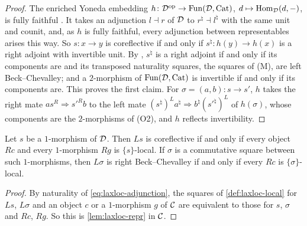 \begin{proof}
%
The enriched Yoneda embedding
$h\colon \mathcal{D}^{\mathrm{op}} \to \operatorname{Fun}(\mathcal{D},\mathrm{Cat})$,
$d \mapsto \operatorname{Hom}_{\mathcal{D}}(d,-)$,
is fully faithful \cite{hinich2020yoneda,heine2023enriched}. It takes an
adjunction $l \dashv r$ of $\mathcal{D}$ to
$r^{\natural} \dashv l^{\natural}$
with the same unit and counit, and, as $h$ is fully faithful, every adjunction
between representables arises this way. So $s\colon x \to y$ is coreflective if
and
only if
$s^{\natural}\colon h(y) \to h(x)$
is a right adjoint with invertible unit. By
\cite[Cor.~5.2.12]{abellangagnahaugseng2024straightening}, $s^{\natural}$ is a
right adjoint if and only if its components are and its transposed naturality
squares, the squares of (M), are left Beck--Chevalley; and a $2$-morphism of
$\operatorname{Fun}(\mathcal{D},\mathrm{Cat})$ is invertible if and only if its components are. This proves
the first claim. For
$\sigma = (a,b)\colon s \to s'$,
$h$ takes the right mate
$as^{R} \Rightarrow s'^{R}b$
to the left mate
$(s^{\natural})^{L}a^{\natural} \Rightarrow b^{\natural}(s'^{\natural})^{L}$
of $h(\sigma)$, whose components are the $2$-morphisms of (O2), and $h$
reflects invertibility.
\end{proof}

\begin{prop}
\label{prop:laxloc-adjunction}
%
Let $s$ be a $1$-morphism of $\mathcal{D}$. Then $Ls$ is coreflective if and only if
every object $Rc$ and every $1$-morphism $Rg$ is $\{s\}$-local. If $\sigma$ is
a commutative square between such $1$-morphisms, then $L\sigma$ is right
Beck--Chevalley if and only if every $Rc$ is $\{\sigma\}$-local.
\end{prop}

\begin{proof}
%
By naturality of \eqref{eq:laxloc-adjunction}, the squares of
\cref{def:laxloc-local} for $Ls$, $L\sigma$ and an object $c$ or a $1$-morphism
$g$ of $\mathcal{C}$ are equivalent to those for $s$, $\sigma$ and $Rc$, $Rg$. So this
is \cref{lem:laxloc-repr} in $\mathcal{C}$.
\end{proof}
